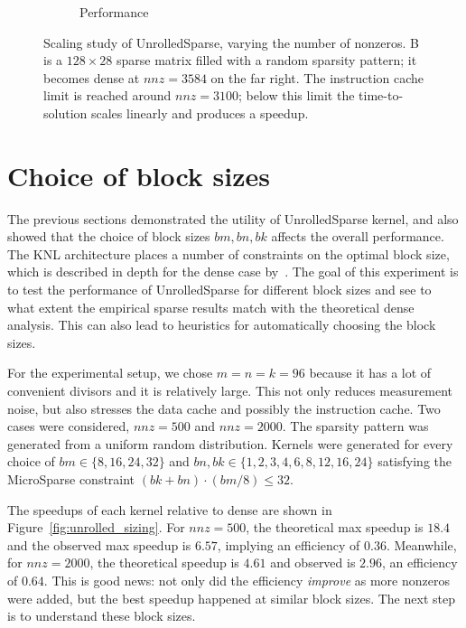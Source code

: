 \begin{figure}[H]
\begin{subfigure}[r]{0.48\textwidth}
      \caption{Performance}
      \label{fig:unrolled_perf}
    \end{subfigure}
    \caption{Scaling study of UnrolledSparse, varying the number of nonzeros. B is a $128\times 28$ sparse matrix filled with a random sparsity pattern; it becomes dense at $nnz=3584$ on the far right. The instruction cache limit is reached around $nnz=3100$; below this limit the time-to-solution scales linearly and produces a speedup. }
    \label{fig:unrolled_scaling}
  \end{figure}




\section{Choice of block sizes}
\label{section:exp_unrolled_sizing}

The previous sections demonstrated the utility of UnrolledSparse kernel, and also showed that the choice of block sizes $bm,bn,bk$ affects the overall performance. The KNL architecture places a number of constraints on the optimal block size, which is described in depth for the dense case by~\cite{Heinecke:2016:LAS:3014904.3015017}. The goal of this experiment is to test the performance of UnrolledSparse for different block sizes and see to what extent the empirical sparse results match with the theoretical dense analysis. This can also lead to heuristics for automatically choosing the block sizes.

For the experimental setup, we chose $m=n=k=96$ because it has a lot of convenient divisors and it is relatively large. This not only reduces measurement noise, but also stresses the data cache and possibly the instruction cache. Two cases were considered, $nnz=500$ and $nnz=2000$. The sparsity pattern was generated from a uniform random distribution. Kernels were generated for every choice of $bm \in \{8,16,24,32\}$ and $bn, bk \in \{1,2,3,4,6,8,12,16,24\}$ satisfying the MicroSparse constraint $(bk+bn) \cdot (bm/8) \leq 32$. 

The speedups of each kernel relative to dense are shown in Figure~\ref{fig:unrolled_sizing}. For $nnz=500$, the theoretical max speedup is $18.4$ and the observed max speedup is $6.57$, implying an efficiency of $0.36$. Meanwhile, for $nnz=2000$, the theoretical speedup is $4.61$ and observed is $2.96$, an efficiency of $0.64$. This is good news: not only did the efficiency \emph{improve} as more nonzeros were added, but the best speedup happened at similar block sizes. The next step is to understand these block sizes.

